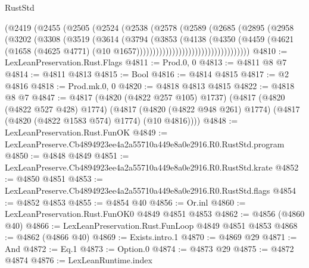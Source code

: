 \begin{lexlean}{RustStd}
\begin{coremodule}
                              (@2419
                                (@2455
                                  (@2505
                                    (@2524
                                      (@2538
                                        (@2578
                                          (@2589
                                            (@2685
                                              (@2895
                                                (@2958
                                                  (@3202
                                                    (@3308
                                                      (@3519
                                                        (@3614
                                                          (@3794
                                                            (@3853
                                                              (@4138
                                                                (@4350
                                                                  (@4459
                                                                    (@4621
                                                                      (@1658
                                                                        (@4625 @4771)
                                                                        (@10
                                                                          @1657)))))))))))))))))))))))))))))))))))
@4810 := LexLeanPreservation.Rust.Flags
@4811 := Prod.{0, 0}
@4813 := @4811 @8 @7
@4814 := @4811 @4813
@4815 := Bool
@4816 := @4814 @4815
@4817 := @2 @4816
@4818 := Prod.mk.{0, 0}
@4820 := @4818 @4813 @4815
@4822 := @4818 @8 @7
@4847 := @4817
    (@4820 (@4822 @257 @105) @1737)
    (@4817
      (@4820 (@4822 @527 @428) @1774)
      (@4817 (@4820 (@4822 @948 @261) @1774) (@4817 (@4820 (@4822 @1583 @574) @1774) (@10 @4816))))
@4848 := LexLeanPreservation.Rust.FunOK
@4849 := LexLeanPreserve.Cb4894923ee4a2a55710a449e8a0e2916.R0.RustStd.program
@4850 := @4848 @4849
@4851 := LexLeanPreserve.Cb4894923ee4a2a55710a449e8a0e2916.R0.RustStd.krate
@4852 := @4850 @4851
@4853 := LexLeanPreserve.Cb4894923ee4a2a55710a449e8a0e2916.R0.RustStd.flags
@4854 := @4852 @4853
@4855 := @4854 @40
@4856 := Or.inl
@4860 := LexLeanPreservation.Rust.FunOK0 @4849 @4851 @4853
@4862 := @4856 (@4860 @40)
@4866 := LexLeanPreservation.Rust.FunLoop @4849 @4851 @4853
@4868 := @4862 (@4866 @40)
@4869 := Exists.intro.{1}
@4870 := @4869 @29
@4871 := And
@4872 := Eq.{1}
@4873 := Option.{0}
@4874 := @4873 @29
@4875 := @4872 @4874
@4876 := LexLeanRuntime.index

\end{coremodule}
\end{lexlean}
